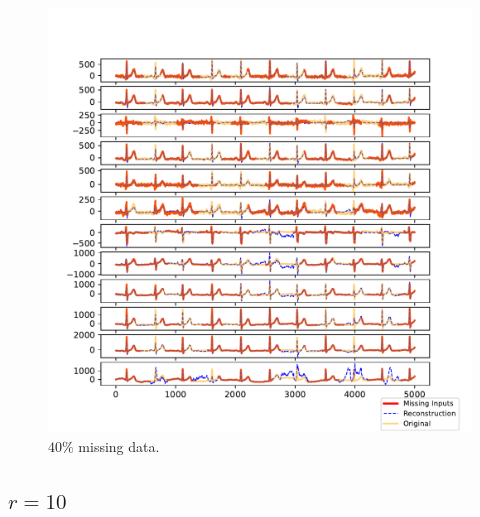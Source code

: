 \documentclass{mldsmsc}
\begin{document}
\begin{figure}[H]
\vspace{1em} %

\begin{minipage}{0.4\linewidth}
    \centering
    \includegraphics[width=\linewidth]{images/missing/rpsmf_output_40_3.pdf}
    \caption{$40\%$ missing data.}
\end{minipage}
\end{figure}

\subsection{$r = 10$}
\end{document}
